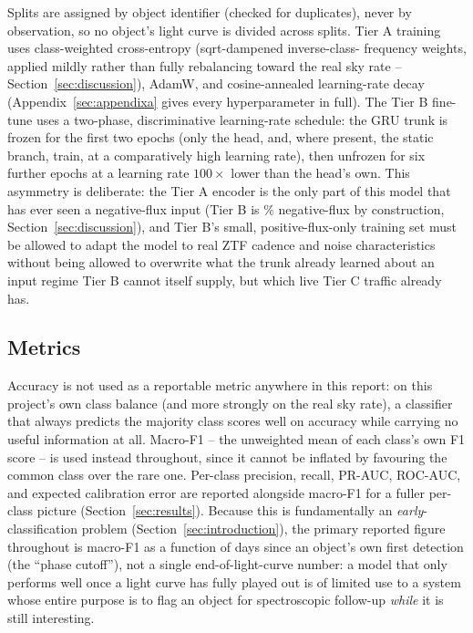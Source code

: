 Splits are assigned by object identifier (checked for duplicates), never by
observation, so no object's light curve is divided across splits. Tier A
training uses class-weighted cross-entropy (sqrt-dampened inverse-class-
frequency weights, applied mildly rather than fully rebalancing toward the
real sky rate -- Section~\ref{sec:discussion}), AdamW, and cosine-annealed
learning-rate decay (Appendix~\ref{sec:appendixa} gives every hyperparameter
in full). The Tier B fine-tune uses a two-phase, discriminative
learning-rate schedule: the GRU trunk is frozen for the first two epochs
(only the head, and, where present, the static branch, train, at a
comparatively high learning rate), then unfrozen for six further epochs at
a learning rate $100\times$ lower than the head's own. This asymmetry is
deliberate: the Tier A encoder is the only part of this model that has ever
seen a negative-flux input (Tier B is \TierBNegFluxFrac{}\% negative-flux by construction,
Section~\ref{sec:discussion}), and Tier B's small, positive-flux-only
training set must be allowed to adapt the model to real ZTF cadence and
noise characteristics without being allowed to overwrite what the trunk
already learned about an input regime Tier B cannot itself supply, but
which live Tier C traffic already has.

\subsection{Metrics}

Accuracy is not used as a reportable metric anywhere in this report: on
this project's own class balance (and more strongly on the real sky rate),
a classifier that always predicts the majority class scores well on
accuracy while carrying no useful information at all. Macro-F1 -- the
unweighted mean of each class's own F1 score -- is used instead throughout,
since it cannot be inflated by favouring the common class over the rare
one. Per-class precision, recall, PR-AUC, ROC-AUC, and expected calibration
error are reported alongside macro-F1 for a fuller per-class picture
(Section~\ref{sec:results}). Because this is fundamentally an
\emph{early}-classification problem (Section~\ref{sec:introduction}), the
primary reported figure throughout is macro-F1 as a function of days since
an object's own first detection (the ``phase cutoff''), not a single
end-of-light-curve number: a model that only performs well once a light
curve has fully played out is of limited use to a system whose entire
purpose is to flag an object for spectroscopic follow-up \emph{while} it is
still interesting.
